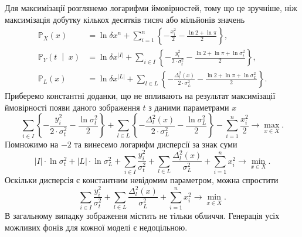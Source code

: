 Для максимізації розглянемо логарифми ймовірностей,
тому що це зручніше,
ніж максимізація добутку кількох десятків тисяч або мільйонів значень
\begin{equation*}
  \begin{split}
    \mathbb{P}_X\left( x \right)
    &= \ln{\delta x^n} +
        \sum_{i = 1}^n
        \left\{
          - \frac{x_i^2}{2}
          - \frac{\ln{2} + \ln{\pi}}{2}
        \right\}, \\
    \mathbb{P}_Y\left( t \;\middle|\; x \right)
    &= \ln{\delta x^{\left| I \right|}} +
        \sum_{i \in I}
        \left\{
          - \frac{y_i^2}{2 \cdot \sigma^2_t}
          - \frac{\ln{2} + \ln{\pi} + \ln{\sigma^2_t}}{2}
        \right\}, \\
    \mathbb{P}_L\left( x \right)
    &= \ln{\delta x^{\left| L \right|}} +
        \sum_{l \in L}
        \left\{
          - \frac{\Delta_l^2\left( x \right)}{2 \cdot \sigma_L^2}
          - \frac{\ln{2} + \ln{\pi} + \ln{\sigma_L^2}}{2}
        \right\}.
  \end{split}
\end{equation*}
Приберемо константні доданки,
що не впливають на результат максимізації ймовірності
появи даного зображення $t$ з даними параметрами $x$
\begin{equation*}
  \sum_{i \in I}
    \left\{
      - \frac{y_i^2}{2 \cdot \sigma^2_t}
      - \frac{\ln{\sigma^2_t}}{2}
    \right\}
  +
  \sum_{l \in L}
    \left\{
      - \frac{\Delta_l^2\left( x \right)}{2 \cdot \sigma_L^2}
      - \frac{\ln{\sigma_L^2}}{2}
    \right\}
  - \sum_{i = 1}^n \frac{x_i^2}{2}
  \to \max\limits_{x \in X}.
\end{equation*}
Помножимо на $-2$ та винесемо логарифм дисперсії за знак суми
\begin{equation*}
  \left| I \right| \cdot \ln{\sigma^2_t}
  + \left| L \right| \cdot \ln{\sigma_L^2}
  + \sum_{i \in I} \frac{y_i^2}{\sigma^2_t}
  + \sum_{l \in L} \frac{\Delta_l^2\left( x \right)}{\sigma_L^2}
  + \sum_{i = 1}^n x_i^2
  \to \min\limits_{x \in X}.
\end{equation*}
Оскільки дисперсія є константним невідомим параметром,
можна спростити
\begin{equation}\label{eq:minimize}
  \sum_{i \in I} \frac{y_i^2}{\sigma^2_t}
  + \sum_{l \in L} \frac{\Delta_l^2\left( x \right)}{\sigma_L^2}
  + \sum_{i = 1}^n x_i^2
  \to \min\limits_{x \in X}.
\end{equation}
В загальному випадку зображення містить не тільки обличчя.
Генерація усіх можливих фонів для кожної моделі є недоцільною.
